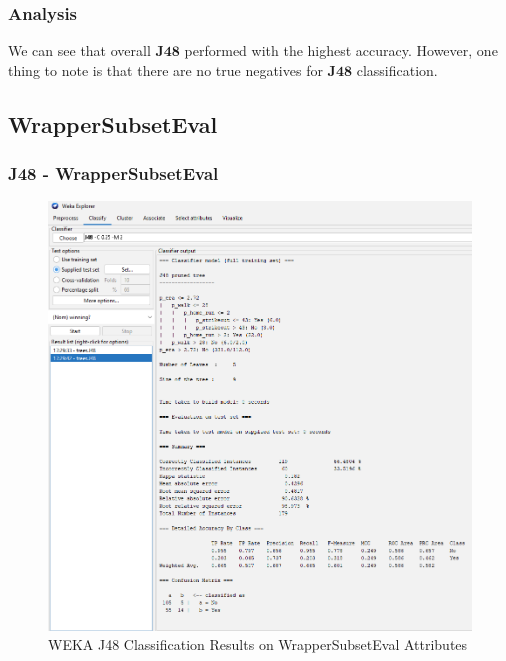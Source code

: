 \documentclass[12pt]{article}
\begin{document}
\newpage
\subsubsection{Analysis}
We can see that overall $\textbf{J48}$ performed with the highest accuracy. However, one thing to note is that there are no true negatives for $\textbf{J48}$ classification. 

\newpage
\subsection{WrapperSubsetEval}

\subsubsection{J48 - WrapperSubsetEval}
\begin{figure}[h!]
    \includegraphics[scale=0.4]{./images/WrapperSubsetEval/J48.png}
\centering
    \caption{WEKA J48 Classification Results on WrapperSubsetEval Attributes}
\end{figure}

\newpage 
\end{document}
